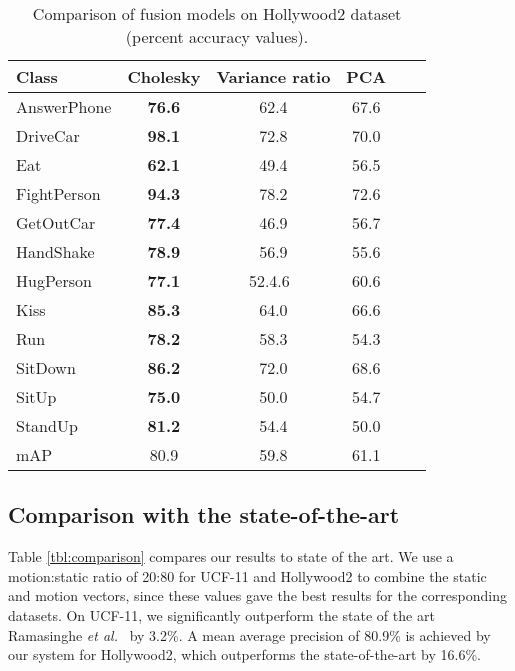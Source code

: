 \begin{table}[]
\centering
\caption{Comparison of fusion models on Hollywood2 dataset (percent accuracy values).}\label{tbl:per-action fusionhollywood}
\begin{tabular}{@{} l c c c c r @{}}
\toprule
Class            & Cholesky & Variance ratio & PCA   \\ \midrule \midrule
AnswerPhone      & \textbf{76.6}& 62.4    & 67.6           \\
DriveCar         & \textbf{98.1}& 72.8    & 70.0       \\
Eat              & \textbf{62.1}& 49.4    & 56.5          \\
FightPerson      & \textbf{94.3}& 78.2    & 72.6         \\
GetOutCar        & \textbf{77.4}& 46.9    & 56.7          \\
HandShake        & \textbf{78.9}         & 56.9    & 55.6            \\
HugPerson        & \textbf{77.1}& 52.4.6\   & 60.6            \\
Kiss             &\textbf{85.3}         & 64.0    & 66.6           \\
Run              & \textbf{78.2}         & 58.3    & 54.3            \\
SitDown          & \textbf{86.2}         & 72.0    & 68.6            \\
SitUp            & \textbf{75.0}         & 50.0    & 54.7          \\
StandUp          & \textbf{81.2}         & 54.4    & 50.0          \\ \midrule
mAP              &      80.9          &   59.8        &       61.1             \\ \bottomrule
\end{tabular}
\end{table}


\subsection{Comparison with the state-of-the-art}

Table \ref{tbl:comparison} compares our results to state of the art. We use a motion:static ratio of 20:80 for UCF-11 and
Hollywood2 to combine the static and motion vectors,
since these values gave the best results for the corresponding datasets. On UCF-11, we significantly outperform
the state of the art Ramasinghe \emph{et al.}~\cite{7486474} by 3.2\%. A mean average precision of 80.9\% is achieved by our system for Hollywood2, which outperforms
the state-of-the-art by 16.6\%.

